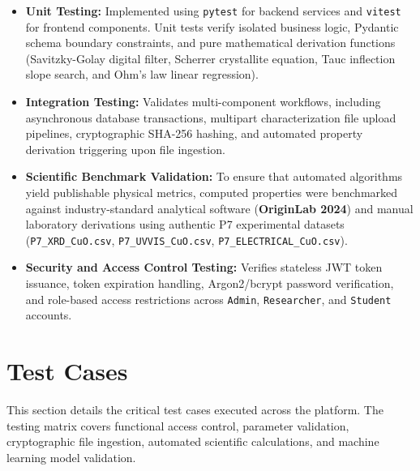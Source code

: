 \documentclass[12pt,a4paper,oneside]{report}
\begin{document}
{{{\begin{itemize}
    \item \textbf{Unit Testing:} Implemented using \texttt{pytest} for backend services and \texttt{vitest} for frontend components. Unit tests verify isolated business logic, Pydantic schema boundary constraints, and pure mathematical derivation functions (Savitzky-Golay digital filter, Scherrer crystallite equation, Tauc inflection slope search, and Ohm's law linear regression).
    \item \textbf{Integration Testing:} Validates multi-component workflows, including asynchronous database transactions, multipart characterization file upload pipelines, cryptographic SHA-256 hashing, and automated property derivation triggering upon file ingestion.
    \item \textbf{Scientific Benchmark Validation:} To ensure that automated algorithms yield publishable physical metrics, computed properties were benchmarked against industry-standard analytical software (\textbf{OriginLab 2024}) and manual laboratory derivations using authentic P7 experimental datasets (\texttt{P7\_XRD\_CuO.csv}, \texttt{P7\_UVVIS\_CuO.csv}, \texttt{P7\_ELECTRICAL\_CuO.csv}).
    \item \textbf{Security and Access Control Testing:} Verifies stateless JWT token issuance, token expiration handling, Argon2/bcrypt password verification, and role-based access restrictions across \texttt{Admin}, \texttt{Researcher}, and \texttt{Student} accounts.
\end{itemize}

\clearpage
\section{Test Cases}

This section details the critical test cases executed across the platform. The testing matrix covers functional access control, parameter validation, cryptographic file ingestion, automated scientific calculations, and machine learning model validation.

}}}
\end{document}
